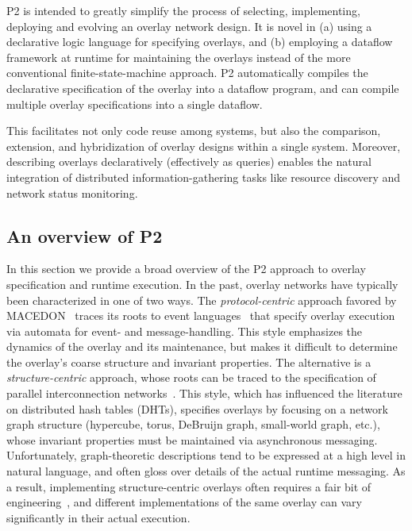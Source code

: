 \documentclass[twocolumn,10pt]{article}
\def\Sys{P2\xspace}
\begin{document}
\Sys is intended to greatly
simplify the process of selecting, implementing, deploying and evolving an
overlay network design.  It is novel in (a) using a declarative logic
language for specifying overlays, and (b) employing a dataflow
framework at runtime for maintaining the overlays instead of the more
conventional finite-state-machine approach.  \Sys automatically
compiles the declarative specification of the overlay into a dataflow
program, and can compile multiple overlay specifications into a single
dataflow. 

This facilitates not only code reuse among systems, but also the
comparison, extension, and hybridization of overlay designs within a
single system.  Moreover, describing overlays declaratively
(effectively as queries) enables the natural integration of
distributed information-gathering tasks like resource discovery and
network status monitoring.  

\subsection{An overview of \Sys}
\label{sec:p2}

In this section we provide a broad overview of the \Sys approach to
overlay specification and runtime execution.  In the past, overlay
networks have
typically been characterized in one of two ways.  The {\em
  protocol-centric} approach favored by MACEDON~\cite{rodriguez04macedon} traces
  its roots to event 
  languages~\cite{estelle-success,fdt-book} that
specify overlay execution via automata for event- and
message-handling.  This style emphasizes the dynamics of the overlay
and its maintenance, but makes it difficult to determine the overlay's
coarse structure and invariant properties.  The alternative is a {\em
  structure-centric} approach, whose roots can be traced to the
  specification of parallel interconnection
  networks~\cite{leighton-book}.  This style, which has influenced
the literature on distributed hash tables (DHTs),  specifies overlays
by focusing on a network graph structure (hypercube, torus, DeBruijn
graph, small-world graph, etc.), whose invariant properties must be 
maintained via asynchronous messaging.  Unfortunately, graph-theoretic
descriptions tend to be expressed at a high level in natural language,
and often gloss over details of the actual
runtime messaging.  As a
result, implementing structure-centric overlays often requires a fair
bit of engineering~\cite{rhea_usenix_2004,dabek_nsdi04}, and different implementations of the same overlay can vary significantly in
their actual execution.
\end{document}
